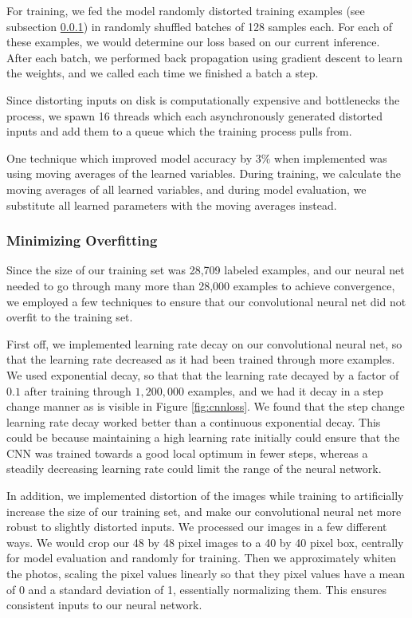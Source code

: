 \documentclass[11pt, twocolumn, twoside]{article}
\begin{document}
For training, we fed the model randomly distorted training examples (see subsection \ref{overfitting}) in randomly shuffled batches of 128 samples each. For each of these examples, we would determine our loss based on our current inference. After each batch, we performed back propagation using gradient descent to learn the weights, and we called each time we finished a batch a step. 

Since distorting inputs on disk is computationally expensive and bottlenecks the process, we spawn 16 threads which each asynchronously generated distorted inputs and add them to a queue which the training process pulls from.

One technique which improved model accuracy by $3\%$ when implemented was using moving averages of the learned variables. During training, we calculate the moving averages of all learned variables, and during model evaluation, we substitute all learned parameters with the moving averages instead.


\subsubsection{Minimizing Overfitting} \label{overfitting}

Since the size of our training set was 28,709 labeled examples, and our neural net needed to go through many more than 28,000 examples to achieve convergence, we employed a few techniques to ensure that our convolutional neural net did not overfit to the training set.

First off, we implemented learning rate decay on our convolutional neural net, so that the learning rate decreased as it had been trained through more examples. We used exponential decay, so that that the learning rate decayed by a factor of $0.1$ after training through $1,200,000$ examples, and we had it decay in a step change manner as is visible in Figure \ref{fig:cnnloss}. We found that the step change learning rate decay worked better than a continuous exponential decay. This could be because maintaining a high learning rate initially could ensure that the CNN was trained towards a good local optimum in fewer steps, whereas a steadily decreasing learning rate could limit the range of the neural network.

In addition, we implemented distortion of the images while training to artificially increase the size of our training set, and make our convolutional neural net more robust to slightly distorted inputs. We processed our images in a few different ways. We would crop our 48 by 48 pixel images to a 40 by 40 pixel box, centrally for model evaluation and randomly for training. Then we approximately whiten the photos, scaling the pixel values linearly so that they pixel values have a mean of 0 and a standard deviation of 1, essentially normalizing them. This ensures consistent inputs to our neural network.
\end{document}
